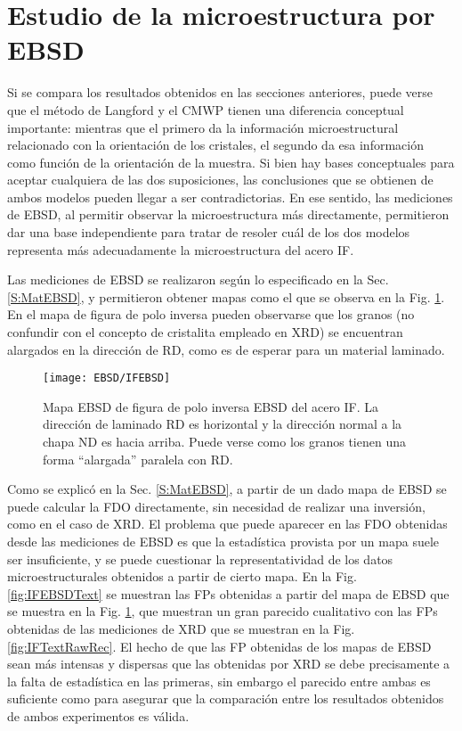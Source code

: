 \section{Estudio de la microestructura por EBSD}\label{S:IFEBSD}
Si se compara los resultados obtenidos en las secciones anteriores, puede verse que el método de Langford y el CMWP tienen una diferencia conceptual importante: mientras que el primero da la información microestructural relacionado con la orientación de los cristales, el segundo da esa información como función de la orientación de la muestra.
Si bien hay bases conceptuales para aceptar cualquiera de las dos suposiciones, las conclusiones que se obtienen de ambos modelos pueden llegar a ser contradictorias.
En ese sentido, las mediciones de EBSD, al permitir observar la microestructura más directamente, permitieron dar una base independiente para tratar de resoler cuál de los dos modelos representa más adecuadamente la microestructura del acero IF.

Las mediciones de EBSD se realizaron según lo especificado en la Sec. \ref{S:MatEBSD}, y permitieron obtener mapas como el que se observa en la Fig. \ref{fig:IFEBSD}.
En el mapa de figura de polo inversa pueden observarse que los granos (no confundir con el concepto de cristalita empleado en XRD) se encuentran alargados en la dirección de RD, como es de esperar para un material laminado.

\begin{figure}[!htb]
  \centering
  \texttt{[image: EBSD/IFEBSD]}
  \caption{Mapa EBSD de figura de polo inversa EBSD del acero IF. La dirección de laminado RD es horizontal y la dirección normal a la chapa ND es hacia arriba. Puede verse como los granos tienen una forma ``alargada'' paralela con RD.}
  \label{fig:IFEBSD}
\end{figure}

Como se explicó en la Sec. \ref{S:MatEBSD}, a partir de un dado mapa de EBSD se puede calcular la FDO directamente, sin necesidad de realizar una inversión, como en el caso de XRD.
El problema que puede aparecer en las FDO obtenidas desde las mediciones de EBSD es que la estadística provista por un mapa suele ser insuficiente, y se puede cuestionar la representatividad de los datos microestructurales obtenidos a partir de cierto mapa.
En la Fig. \ref{fig:IFEBSDText} se muestran las FPs obtenidas a partir del mapa de EBSD que se muestra en la Fig. \ref{fig:IFEBSD}, que muestran un gran parecido cualitativo con las FPs obtenidas de las mediciones de XRD que se muestran en la Fig. \ref{fig:IFTextRawRec}.
El hecho de que las FP obtenidas de los mapas de EBSD sean más intensas y dispersas que las obtenidas por XRD se debe precisamente a la falta de estadística en las primeras, sin embargo el parecido entre ambas es suficiente como para asegurar que la comparación entre los resultados obtenidos de ambos experimentos es válida.

